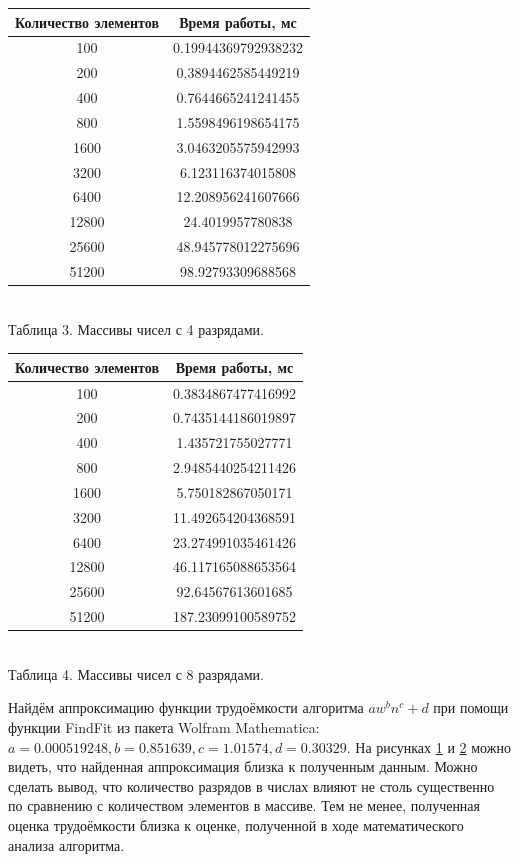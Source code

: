 \documentclass[a4paper]{article}
\begin{document}
\begin{center}
	\label{table3}
\begin{tabular}{|c|c|}
	\hline
	Количество элементов & Время работы, мс \\
	\hline
	100 & 0.19944369792938232 \\ \hline
    200 & 0.3894462585449219 \\ \hline
    400 & 0.7644665241241455 \\ \hline
    800 & 1.5598496198654175 \\ \hline
    1600 & 3.0463205575942993 \\ \hline
    3200 & 6.123116374015808 \\ \hline
    6400 & 12.208956241607666 \\ \hline
    12800 & 24.4019957780838 \\ \hline
    25600 & 48.945778012275696 \\ \hline
    51200 & 98.92793309688568 \\ \hline
\end{tabular} \\
\hfill \break
	Таблица 3. Массивы чисел с 4 разрядами.
	\break \hfill \break
	\label{table4}
\begin{tabular}{|c|c|}
	\hline
	Количество элементов & Время работы, мс \\
	\hline
	100 & 0.3834867477416992 \\ \hline
    200 & 0.7435144186019897 \\ \hline
    400 & 1.435721755027771 \\ \hline
    800 & 2.9485440254211426 \\ \hline
    1600 & 5.750182867050171 \\ \hline
    3200 & 11.492654204368591 \\ \hline
    6400 & 23.274991035461426 \\ \hline
    12800 & 46.117165088653564 \\ \hline
    25600 & 92.64567613601685 \\ \hline
    51200 & 187.23099100589752 \\ \hline
\end{tabular} \\
\hfill \break
	Таблица 4. Массивы чисел с 8 разрядами.
\end{center}
\newpage
Найдём аппроксимацию функции трудоёмкости алгоритма $aw^bn^c+d$ при помощи функции FindFit из пакета Wolfram Mathematica: $a=0.000519248, b=0.851639, c=1.01574, d=0.30329$. На рисунках \hyperref[image1]{1} и \hyperref[image2]{2} можно видеть, что найденная аппроксимация близка к полученным данным. Можно сделать вывод, что количество разрядов в числах влияют не столь существенно по сравнению с количеством элементов в массиве. Тем не менее, полученная оценка трудоёмкости близка к оценке, полученной в ходе математического анализа алгоритма.
\end{document}
